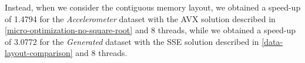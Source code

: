 \documentclass{article}
\begin{document}
Instead, when we consider the contiguous memory layout, we obtained a speed-up of 1.4794 for the
\textit{Accelerometer} dataset with the AVX solution described in
\ref{micro-optimization-no-square-root} and 8 threads, while we obtained a speed-up of 3.0772 for
the \textit{Generated} dataset with the SSE solution described in \ref{data-layout-comparison}
and 8 threads.



\newlength{\graphShift}
\newlength{\axesLineWidth}
\newlength{\gridLineWidth}
\newlength{\graphLineWidth}
\setlength{\graphShift}{30mm}
\setlength{\axesLineWidth}{2pt}
\setlength{\gridLineWidth}{1pt}
\setlength{\graphLineWidth}{2pt}




\end{document}
